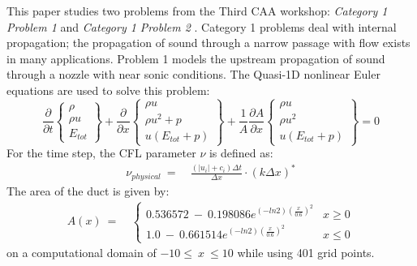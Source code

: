 \documentclass[conf]{new-aiaa}
\begin{document}
This paper studies two problems from the Third CAA workshop: \textit{Category 1 Problem 1} and \textit{Category 1 Problem 2} \cite{CAA3}. 
Category 1 problems deal with internal propagation; 
the propagation of sound through a narrow passage with flow exists in many applications. 
Problem 1 models the upstream propagation of sound through a nozzle with near sonic conditions. 
The Quasi-1D nonlinear Euler equations are used to solve this problem:
\begin{equation}
    \label{eq:Euler}
    \frac{\partial{}}{\partial{t}} 
    \begin{Bmatrix}
        \rho \\
        \rho{u} \\
        E_{tot}
  \end{Bmatrix}+\frac{\partial{}}{\partial{x}}
    \begin{Bmatrix}
        \rho{u} \\
        \rho{u^2}+p \\
        u(E_{tot}+p)
  \end{Bmatrix} +\frac{1}{A}\frac{\partial{A}}{\partial{x}}
    \begin{Bmatrix}
        \rho{u} \\
        \rho{u^2} \\
        u(E_{tot}+p)
  \end{Bmatrix}= 0
\end{equation}
For the time step, the CFL parameter $\nu$ is defined as:
\begin{equation}
	\begin{split}
		\label{eq:}
  			\nu_{physical}
  			~=&~\frac{\left(\left|u_i\right|+c_i\right)\Delta{t}}{\Delta{x}}\cdot\left(k\Delta{x}\right)^*
	\end{split}
\end{equation}
The area of the duct is given by:
\begin{equation}
	\begin{split}
		\label{eq:}
  			A(x)~=&~\left\{
  			\begin{matrix}
  				0.536572~-~0.198086e^{\left(-ln2\right)\left(\frac{x}{0.6}\right)^2} & x \geq 0 \\
  				1.0~-~0.661514e^{\left(-ln2\right)\left(\frac{x}{0.6}\right)^2} & x \leq 0
  			\end{matrix}
  			\right.
	\end{split}
\end{equation}
on a computational domain of $-10\leq~x~\leq10$ while using 401 grid points. 
\end{document}
